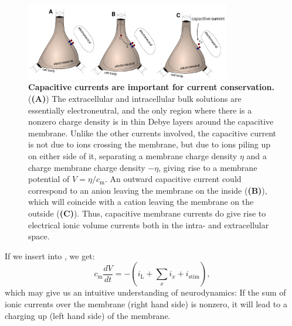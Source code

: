 \begin{figure}[!ht]
\begin{center}
\includegraphics[width=0.8\textwidth]{Figures/Neuron/capacitive_currents.pdf}
\end{center}
\caption{\textbf{Capacitive currents are important for current conservation.}  (\textbf{(A)}) The extracellular and intracellular bulk solutions are essentially electroneutral, and the only region where there is a nonzero charge density is in thin Debye layers around the capacitive membrane. Unlike the other currents involved, the capacitive current is not due to ions crossing the membrane, but due to ions piling up on either side of it, separating a membrane charge density $\eta$ and a charge membrane charge density $-\eta$, giving rise to a membrane potential of $V = \eta/c_{\mathrm{m}}$. An outward capacitive current could correspond to an anion leaving the membrane on the inside (\textbf{(B)}), which will coincide with a cation leaving the membrane on the outside (\textbf{(C)}). Thus, capacitive membrane currents do give rise to electrical ionic volume currents both in the intra- and extracellular space.
}
\label{fig:Neuron:capacitive_currents}
\end{figure}

If we insert  into , we get:
\begin{equation}
c_{\mathrm{m}} \frac{dV}{dt} = - (i_{\mathrm{L}} + \sum_x{i_x} +  i_{\mathrm{stim}}),
\label{eq:Neuron:singlecomp_capinserted}
\end{equation}
which may give us an intuitive understanding of neurodynamics: If the sum of ionic currents over the membrane (right hand side) is nonzero, it will lead to a charging up (left hand side) of the membrane. 


\subsection{}
\label{sec:Neuron:leak}

